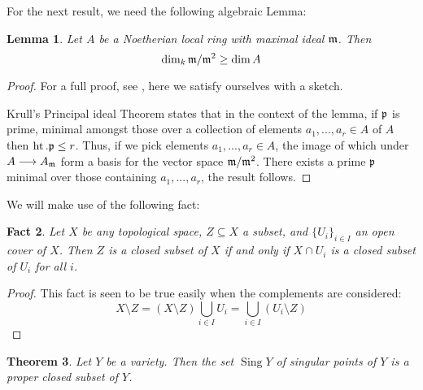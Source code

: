 \documentclass[12pt]{article}
\theoremstyle{plain}
\newtheorem{thm}{Theorem}[subsection] %
\newtheorem{lemma}[thm]{Lemma}
\newtheorem{fact}[thm]{Fact}
\theoremstyle{definition}
\newcommand{\lto}{\longrightarrow}
\begin{document}
For the next result, we need the following algebraic Lemma:
\begin{lemma}\label{lem:max_ideal_lemma}
Let $A$ be a Noetherian local ring with maximal ideal $\frak{m}$. Then
\begin{equation}
\operatorname{dim}_k\frak{m}/\frak{m}^2 \geq \operatorname{dim}A
\end{equation}
\end{lemma}
\begin{proof}
For a full proof, see \cite{algebra}, here we satisfy ourselves with a sketch.

Krull's Principal ideal Theorem states that in the context of the lemma, if $\frak{p}$ is prime, minimal amongst those over a collection of elements $a_1,...,a_r \in A$ of $A$ then $\operatorname{ht}.\frak{p} \leq r$. Thus, if we pick elements $a_1,...,a_r \in A$, the image of which under $A \lto A_{\frak{m}}$ form a basis for the vector space $\frak{m}/\frak{m}^2$. There exists a prime $\frak{p}$ minimal over those containing $a_1,...,a_r$, the result follows.
\end{proof}
We will make use of the following fact:
\begin{fact}\label{fact:cover_closed_with_open}
Let $X$ be any topological space, $Z \subseteq X$ a subset, and $\lbrace U_i\rbrace_{ i \in I}$ an open cover of $X$. Then $Z$ is a closed subset of $X$ if and only if $X \cap U_i$ is a closed subset of $U_i$ for all $i$.
\end{fact}
\begin{proof}
This fact is seen to be true easily when the complements are considered:
\begin{equation}
X\setminus Z = (X \setminus Z) \bigcup_{i \in I}U_i = \bigcup_{i \in I}(U_i \setminus Z)
\end{equation}
\end{proof}
\begin{thm}
Let $Y$ be a variety. Then the set $\operatorname{Sing}Y$ of singular points of $Y$ is a proper closed subset of $Y$.
\end{thm}
\end{document}
